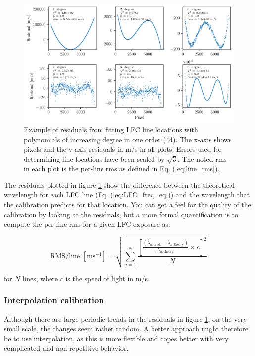     \begin{figure}%
        \begin{wide}  
            \includegraphics[width=\textwidth]{figures/calib/calib_poly_fit_degrees_order44_residuals_ang.pdf}
            \caption{Example of residuals from fitting LFC line locations with polynomials of increasing degree in one order (44). The x-axis shows pixels and the y-axis residuals in m/s in all plots. Errors used for determining line locations have been scaled by $\sqrt{3}$. The noted rms in each plot is the per-line rms as defined in Eq. (\ref{eq:line_rms}).}
            \label{fig:LFC_calib_poly_degrees}
        \end{wide}
    \end{figure}

    The residuals plotted in figure \ref{fig:LFC_calib_poly_degrees} show the difference between the theoretical wavelength for each LFC line (Eq. (\ref{eq:LFC_freq_eq})) and the wavelength that the calibration predicts for that location. You can get a feel for the quality of the calibration by looking at the residuals, but a more formal quantification is to compute the per-line rms for a given LFC exposure as: 
    
    \begin{equation}        
        \text{RMS/line } [\text{ms}^{-1}] = \sqrt{\sum_{n=1}^{N} \frac{\left[\frac{\left(\lambda_{n, \text {pred.}}-\lambda_{n, \text {theory}}\right)}{\lambda_{n,\text{theory}}} \times c\right]^{2}}{N}}
        \label{eq:line_rms}
    \end{equation}

    for $N$ lines, where $c$ is the speed of light in m/s.
    
    \subsubsection{Interpolation calibration}
    Although there are large periodic trends in the residuals in figure \ref{fig:LFC_calib_poly_degrees}, on the very small scale, the changes seem rather random. A better approach might therefore be to use interpolation, as this is more flexible and copes better with very complicated and non-repetitive behavior.
    
